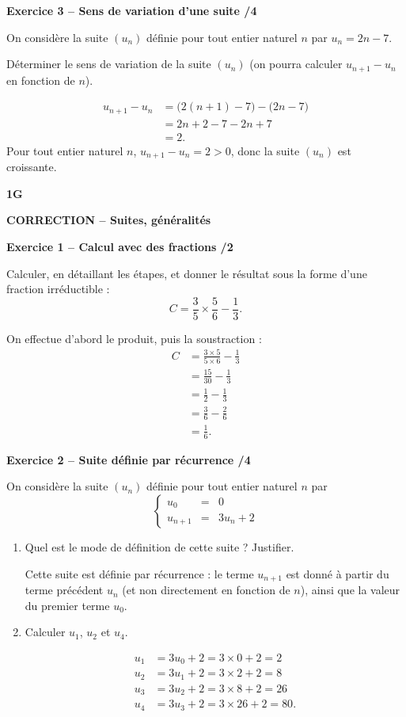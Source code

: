 \documentclass[10pt,a4paper]{article}
\renewcommand{\niveau}{1G}
\renewcommand{\chapitre}{Suites, généralités}
\renewcommand{\interroversion}[1]{
    \noindent\textbf{\niveau}

    \vspace{-0.5cm}
    \begin{center}
        \textbf{\large CORRECTION -- \chapitre}
    \end{center}

    \vspace{0.1cm}
}
\begin{document}
\textbf{Exercice 3 -- Sens de variation d'une suite \hfill /4}

On considère la suite \((u_n)\) définie pour tout entier naturel \(n\) par \(u_n=2n-7\).

Déterminer le sens de variation de la suite \((u_n)\) (on pourra calculer \(u_{n+1}-u_n\) en fonction de \(n\)).

\[
\begin{aligned}
u_{n+1}-u_n &= \bigl(2(n+1)-7\bigr)-\bigl(2n-7\bigr)\\
            &= 2n+2-7-2n+7\\
            &= 2.
\end{aligned}
\]
Pour tout entier naturel \(n\), \(u_{n+1}-u_n=2>0\), donc la suite \((u_n)\) est croissante.

\newpage


\interroversion{C}

\textbf{Exercice 1 -- Calcul avec des fractions \hfill /2}

Calculer, en détaillant les étapes, et donner le résultat sous la forme d'une fraction irréductible :
\[
C = \frac{3}{5}\times\frac{5}{6}-\frac{1}{3}.
\]

On effectue d'abord le produit, puis la soustraction :
\[
\begin{aligned}
C &= \frac{3\times5}{5\times6}-\frac{1}{3}\\
  &= \frac{15}{30}-\frac{1}{3}\\
  &= \frac{1}{2}-\frac{1}{3}\\
  &= \frac{3}{6}-\frac{2}{6}\\
  &= \frac{1}{6}.
\end{aligned}
\]

\textbf{Exercice 2 -- Suite définie par récurrence \hfill /4}

On considère la suite \((u_n)\) définie pour tout entier naturel \(n\) par
\[
\left\{\begin{array}{rcl}
u_0 &=& 0 \\
u_{n+1} &=& 3u_n+2
\end{array}\right.
\]

\begin{enumerate}
\item Quel est le mode de définition de cette suite ? Justifier.

Cette suite est définie par récurrence : le terme \(u_{n+1}\) est donné à partir du terme précédent \(u_n\) (et non directement en fonction de \(n\)), ainsi que la valeur du premier terme \(u_0\).

\item Calculer \(u_1\), \(u_2\) et \(u_4\).

\[
\begin{aligned}
u_1 &= 3u_0+2 = 3\times0+2 = 2\\
u_2 &= 3u_1+2 = 3\times2+2 = 8\\
u_3 &= 3u_2+2 = 3\times8+2 = 26\\
u_4 &= 3u_3+2 = 3\times26+2 = 80.
\end{aligned}
\]
\end{enumerate}
\end{document}
